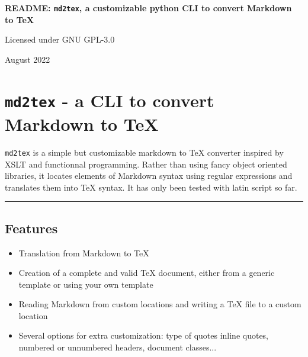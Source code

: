 \documentclass[a4paper, 12pt, twoside]{book}
\begin{document}
	\onehalfspacing

	\begin{titlepage}
		\begin{center}
			\hspace{0pt}

			\vfill

			\begin{Huge}
				\textbf{README: \texttt{md2tex}, a customizable python CLI to convert Markdown to TeX}
			\end{Huge}

			\vfill

			\begin{large}
				Licensed under GNU GPL-3.0

				\bigskip

				August 2022
			\end{large}
		\end{center}
	\end{titlepage}

\chapter*{\texttt{md2tex} - a CLI to convert Markdown to TeX}

\texttt{md2tex} is a simple but customizable markdown to TeX converter inspired by XSLT and functionnal programming. 
Rather than using fancy object oriented libraries, it locates elements of Markdown syntax using regular 
expressions and translates them into TeX syntax. It has only been tested with latin script so far.

\par\noindent\rule{\linewidth}{0.4pt}
\section*{Features}

\begin{itemize}
\item Translation from Markdown to TeX
\item Creation of a complete and valid TeX document, either from a generic template or using your own template
\item Reading Markdown from custom locations and writing a TeX file to a custom location
\item Several options for extra customization: type of quotes inline quotes, numbered or unnumbered headers, document classes... 
\end{itemize}
\end{document}
